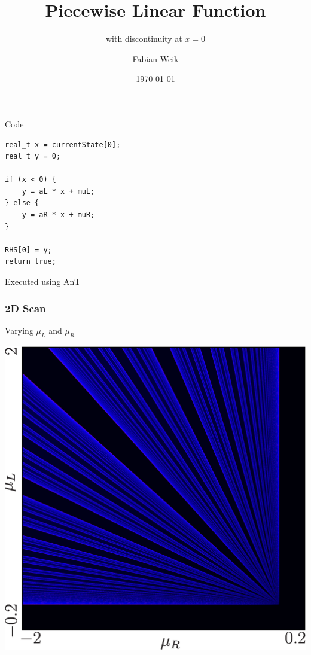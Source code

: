\documentclass{beamer}
\title{Piecewise Linear Function}
\subtitle{with discontinuity at $x = 0$}
\author{Fabian Weik}
\institute{Overleaf}
\date{\today}
\begin{document}
\frame{\titlepage}

\begin{frame}[fragile]{Code}
    \begin{lstlisting}
real_t x = currentState[0];
real_t y = 0;

if (x < 0) {
    y = aL * x + muL;
} else {
    y = aR * x + muR;
}

RHS[0] = y;
return true;
    \end{lstlisting}
    
    Executed using AnT
    
\end{frame}

\begin{frame}
\frametitle{2D Scan}
    Varying $\mu_L$ and $\mu_R$
    
    \centering
    \vspace*{1em}
    \includegraphics[width=0.6 \textwidth]{../../Simulation/Models/00_Examples/03_Homework_0110/2D_Period/result.png}
\end{frame}
\end{document}

